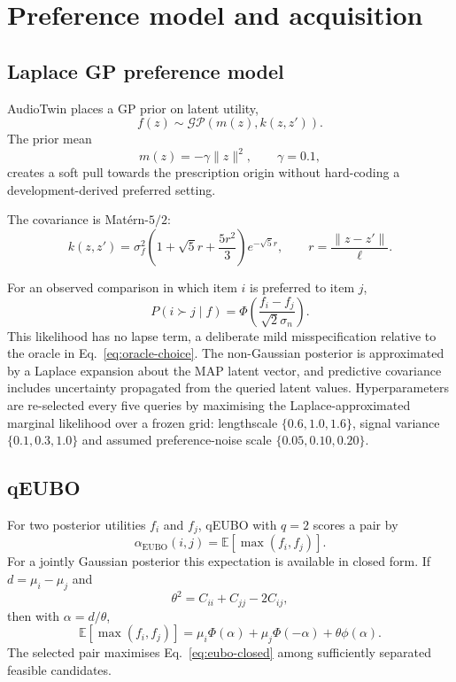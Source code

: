 \documentclass[preprint,12pt]{elsarticle}
\begin{document}
\section{Preference model and acquisition}
\label{sec:model}

\subsection{Laplace GP preference model}

AudioTwin places a GP prior on latent utility,
\begin{equation}
 f(z)\sim\mathcal{GP}(m(z),k(z,z')).
\end{equation}
The prior mean
\begin{equation}
 m(z)=-\gamma\|z\|^2, \qquad \gamma=0.1,
\end{equation}
creates a soft pull towards the prescription origin without hard-coding a development-derived preferred setting.

The covariance is Mat\'ern-$5/2$:
\begin{equation}
 k(z,z')=\sigma_f^2\left(1+\sqrt{5}r+\frac{5r^2}{3}\right)e^{-\sqrt{5}r},
 \qquad r=\frac{\|z-z'\|}{\ell}.
 \label{eq:matern}
\end{equation}

For an observed comparison in which item $i$ is preferred to item $j$,
\begin{equation}
 P(i\succ j\mid f)=\Phi\left(\frac{f_i-f_j}{\sqrt{2}\sigma_n}\right).
 \label{eq:probit}
\end{equation}
This likelihood has no lapse term, a deliberate mild misspecification relative to the oracle in Eq.~\eqref{eq:oracle-choice}. The non-Gaussian posterior is approximated by a Laplace expansion about the MAP latent vector, and predictive covariance includes uncertainty propagated from the queried latent values. Hyperparameters are re-selected every five queries by maximising the Laplace-approximated marginal likelihood over a frozen grid: lengthscale $\{0.6,1.0,1.6\}$, signal variance $\{0.1,0.3,1.0\}$ and assumed preference-noise scale $\{0.05,0.10,0.20\}$.

\subsection{qEUBO}

For two posterior utilities $f_i$ and $f_j$, qEUBO with $q=2$ scores a pair by
\begin{equation}
 \alpha_{\mathrm{EUBO}}(i,j)=\mathbb E[\max(f_i,f_j)].
 \label{eq:eubo}
\end{equation}
For a jointly Gaussian posterior this expectation is available in closed form. If $d=\mu_i-\mu_j$ and
\begin{equation}
 \theta^2=C_{ii}+C_{jj}-2C_{ij},
\end{equation}
then with $\alpha=d/\theta$,
\begin{equation}
 \mathbb E[\max(f_i,f_j)] = \mu_i\Phi(\alpha)+\mu_j\Phi(-\alpha)+\theta\phi(\alpha).
 \label{eq:eubo-closed}
\end{equation}
The selected pair maximises Eq.~\eqref{eq:eubo-closed} among sufficiently separated feasible candidates.
\end{document}
